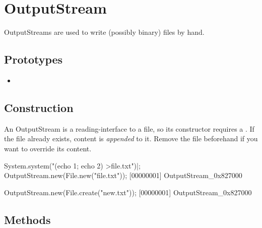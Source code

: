 \section{OutputStream}

OutputStreams are used to write (possibly binary) files by hand.

\subsection{Prototypes}
\begin{itemize}
\item {}
\end{itemize}

\subsection{Construction}

An OutputStream is a reading-interface to a file, so its constructor
requires a .  If the file already exists, content is
\emph{appended} to it.  Remove the file beforehand if you want to
override its content.

\begin{urbiscript}
System.system("(echo 1; echo 2) >file.txt")|;
OutputStream.new(File.new("file.txt"));
[00000001] OutputStream_0x827000

OutputStream.new(File.create("new.txt"));
[00000001] OutputStream_0x827000
\end{urbiscript}

\subsection{Methods}

